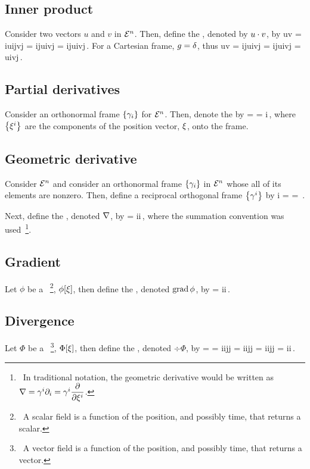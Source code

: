 \subsection{Inner product}
Consider two vectors $u$ and $v$ in $\mathcal{\mathcal{E}}^{n}$. Then, define the , denoted by $u\cdot v$, by
\beq
u\iprod v = \fbvec i\fvec ui\iprod\fbvec j\fvec vj
          = \fbvec i\iprod\fbvec j\fvec ui\fvec vj
          = \fmet ij\fvec ui\fvec vj\,.
\eeq
For a Cartesian frame, $g = \delta$, thus
\beq
u\iprod v = \fmet ij\fvec ui\fvec vj
          = \fkron ij\fvec ui\fvec vj
          = \fvec ui\fvec vj\,.
\eeq


\subsection{Partial derivatives}
Consider an orthonormal frame $\left\lbrace{\gamma_{i}}\right\rbrace$ for $\mathcal{\mathcal{E}}^{n}$. Then, denote the  by
\beq
{} =  
                    = \igd i\,,
\eeq
where $\left\lbrace{{\xi}^{i}}\right\rbrace$ are the components of the position vector, $\xi$, onto the frame.


\subsection{Geometric derivative}
Consider $\mathcal{\mathcal{E}}^{n}$ and consider an orthonormal frame $\left\lbrace{\gamma_{i}}\right\rbrace$ in $\mathcal{\mathcal{E}}^{n}$ whose all of its elements are nonzero. Then, define a reciprocal orthogonal frame $\left\lbrace{\gamma^{i}}\right\rbrace$ by
\beq
\rbvec i =  = \,.
\eeq

Next, define the , denoted $\nabla$, by
\beq
\gder = \rbvec i\igd i\,,
\eeq
where the summation convention was used~\footnote{~In traditional notation, the geometric derivative would be written as $\nabla = \gamma^{i}\partial_{i} = \gamma^{i}\dfrac{\partial{}}{\partial{{\xi}^{i}}}$.}.


\subsection{Gradient}
Let $\phi$ be a ~\footnote{~A scalar field is a function of the position, and possibly time, that returns a scalar.}, $\phi\!\left[{\xi}\right]$, then define the , denoted $\operatorname{grad}\phi$, by
\beq
\grad\phi = \rbvec i\igd i\phi\,.
\eeq


\subsection{Divergence}
Let $\Phi$ be a ~\footnote{~A vector field is a function of the position, and possibly time, that returns a vector.}, $\Phi\!\left[{\xi}\right]$, then define the , denoted $\div\Phi$, by
\beq
\div\Phi = \gder\iprod\Phi 
         = \rbvec i\igd i\iprod\fbvec j\fvec\Phi j
         = \igd i\rbvec i\iprod\fbvec j\fvec\Phi j
         = \igd i\mmet ij\fvec\Phi j
         = \igd i\fvec\Phi i\,.
\eeq


